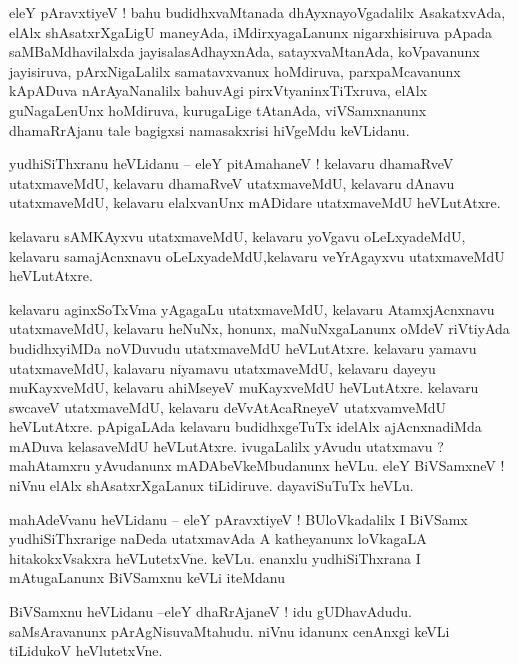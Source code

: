 \documentclass{article}
\begin{document}
\begin{mn}%
eleY pAravxtiyeV ! bahu budidhxvaMtanada dhAyxnayoVgadalilx AsakatxvAda, elAlx shAsatxrXgaLigU 
maneyAda, iMdirxyagaLanunx nigarxhisiruva pApada saMBaMdhavilalxda jayisalasAdhayxnAda, 
satayxvaMtanAda, koVpavanunx jayisiruva, pArxNigaLalilx samatavxvanux hoMdiruva, parxpaMcavanunx 
kApADuva nArAyaNanalilx bahuvAgi pirxVtyaninxTiTxruva, elAlx guNagaLenUnx hoMdiruva, kurugaLige 
tAtanAda, viVSamxnanunx dhamaRrAjanu tale bagigxsi namasakxrisi hiVgeMdu keVLidanu.
\end{mn}

\begin{mn}%
yudhiSiThxranu heVLidanu -- eleY pitAmahaneV ! kelavaru dhamaRveV utatxmaveMdU, kelavaru dhamaRveV 
utatxmaveMdU, kelavaru dAnavu utatxmaveMdU, kelavaru elalxvanUnx mADidare utatxmaveMdU heVLutAtxre.
\end{mn}

\begin{mn}%
kelavaru sAMKAyxvu utatxmaveMdU, kelavaru yoVgavu oLeLxyadeMdU, kelavaru samajAcnxnavu 
oLeLxyadeMdU,kelavaru veYrAgayxvu utatxmaveMdU heVLutAtxre.
\end{mn}

\begin{mn}%
kelavaru aginxSoTxVma yAgagaLu utatxmaveMdU, kelavaru AtamxjAcnxnavu utatxmaveMdU, kelavaru heNuNx, 
honunx, maNuNxgaLanunx oMdeV riVtiyAda budidhxyiMDa noVDuvudu utatxmaveMdU heVLutAtxre. kelavaru 
yamavu utatxmaveMdU, kalavaru niyamavu utatxmaveMdU, kelavaru dayeyu muKayxveMdU, kelavaru 
ahiMseyeV muKayxveMdU heVLutAtxre. kelavaru swcaveV utatxmaveMdU, kelavaru deVvAtAcaRneyeV 
utatxvamveMdU heVLutAtxre. pApigaLAda kelavaru budidhxgeTuTx idelAlx ajAcnxnadiMda mADuva 
kelasaveMdU heVLutAtxre. ivugaLalilx yAvudu utatxmavu ? mahAtamxru yAvudanunx mADAbeVkeMbudanunx 
heVLu. eleY BiVSamxneV ! niVnu elAlx shAsatxrXgaLanux tiLidiruve. dayaviSuTuTx heVLu.
\end{mn}

\begin{mn}%
mahAdeVvanu heVLidanu -- eleY pAravxtiyeV ! BUloVkadalilx I BiVSamx yudhiSiThxrarige naDeda 
utatxmavAda A katheyanunx loVkagaLA hitakokxVsakxra heVLutetxVne. keVLu. enanxlu yudhiSiThxrana I 
mAtugaLanunx BiVSamxnu keVLi iteMdanu
\end{mn}

\begin{mn}%
BiVSamxnu heVLidanu --eleY dhaRrAjaneV ! idu gUDhavAdudu. saMsAravanunx pArAgNisuvaMtahudu. niVnu 
idanunx cenAnxgi keVLi tiLidukoV heVlutetxVne.
\end{mn}
\end{document}
